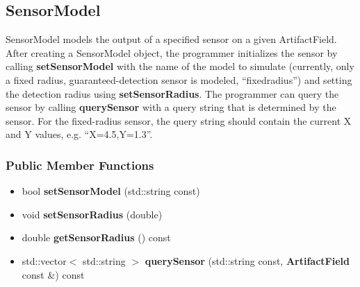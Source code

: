 \subsection{SensorModel}
\label{classSensorModel}
SensorModel models the output of a specified sensor on a given ArtifactField.  After creating a SensorModel object, the programmer initializes the sensor by calling {\bf set\-Sensor\-Model} with the name of the model to simulate (currently, only a fixed radius, guaranteed-detection sensor is modeled, ``fixedradius'') and setting the detection radius using {\bf set\-Sensor\-Radius}.  The programmer can query the sensor by calling {\bf query\-Sensor} with a query string that is determined by the sensor.  For the fixed-radius sensor, the query string should contain the current X and Y values, e.g. ``X=4.5,Y=1.3''.

\subsubsection*{Public Member Functions}
\begin{itemize}
\item bool {\bf set\-Sensor\-Model} (std::string const)
\item void {\bf set\-Sensor\-Radius} (double)
\item double {\bf get\-Sensor\-Radius} () const
\item std::vector$<$ std::string $>$ {\bf query\-Sensor} (std::string const, {\bf Artifact\-Field} const \&) const
\end{itemize}

